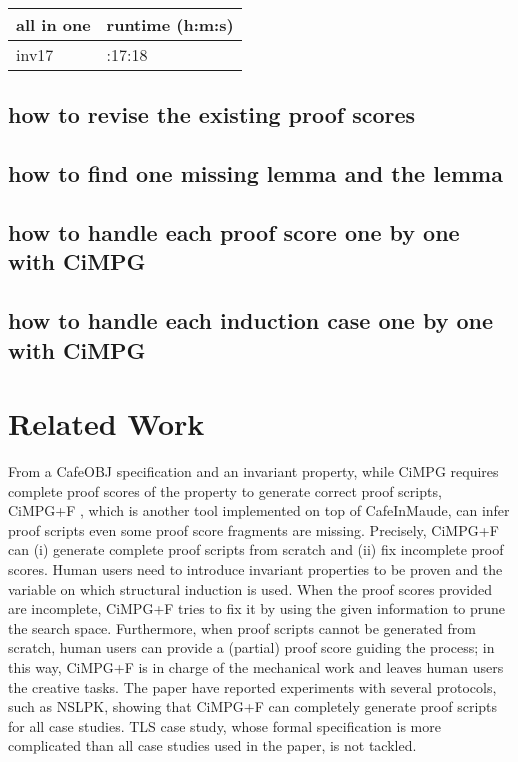 \documentclass[a4paper,fleqn]{cas-dc}
\begin{document}
\begin{table}[]
\begin{tabularx}{0.48\textwidth} { 
  | >{\centering\arraybackslash}X 
  | >{\centering\arraybackslash}X|
 }
 \hline
 all in one & runtime (h:m:s) \\
 \hline
 inv17 & 52:17:18 \\
 \hline
\end{tabularx}
\end{table}


\subsection{how to revise the existing proof scores}
\subsection{how to find one missing lemma and the lemma}
\subsection{how to handle each proof score one by one with CiMPG}
\subsection{how to handle each induction case one by one with CiMPG}


\section{Related Work}\label{relatedwork}
From a CafeOBJ specification and an invariant property,
while CiMPG requires complete proof scores of the property to generate correct proof scripts,
CiMPG+F \cite{Riesco20}, which is another tool implemented on top of CafeInMaude,
can infer proof scripts even some proof score fragments are missing.
Precisely, CiMPG+F can (i) generate complete proof scripts from scratch and (ii) fix incomplete proof scores.
Human users need to introduce invariant properties to be proven and the variable on which structural induction is used.
When the proof scores provided are incomplete, CiMPG+F tries to fix it by using the given information to prune the search space.
Furthermore, when proof scripts cannot be generated from scratch, human users can provide a (partial) proof score guiding the process; in this way, CiMPG+F is in charge of the mechanical work and leaves human users the creative tasks.
The paper \cite{Riesco20} have reported experiments with several protocols, such as NSLPK, showing that CiMPG+F can completely generate proof scripts for all case studies.
TLS case study, whose formal specification is more complicated than all case studies used in the paper, is not tackled.
\end{document}
